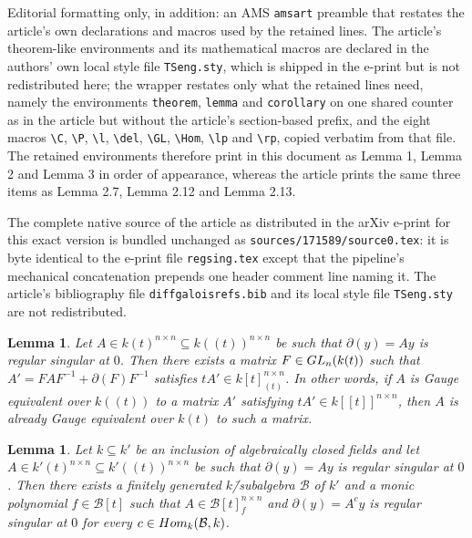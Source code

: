 \documentclass[10pt,a4paper]{amsart}
\newtheorem{lemma}[theorem]{Lemma}
\def\l{\mathcal}
\def\del{\partial}
\def\GL{\textup{GL}}
\def\Hom{\textup{Hom}}
\begin{document}
Editorial formatting only, in addition: an AMS \texttt{amsart} preamble that restates the article's own declarations and macros used by the retained lines. The article's theorem-like environments and its mathematical macros are declared in the authors' own local style file \texttt{TSeng.sty}, which is shipped in the e-print but is not redistributed here; the wrapper restates only what the retained lines need, namely the environments \texttt{theorem}, \texttt{lemma} and \texttt{corollary} on one shared counter as in the article but without the article's section-based prefix, and the eight macros \texttt{\textbackslash C}, \texttt{\textbackslash P}, \texttt{\textbackslash l}, \texttt{\textbackslash del}, \texttt{\textbackslash GL}, \texttt{\textbackslash Hom}, \texttt{\textbackslash lp} and \texttt{\textbackslash rp}, copied verbatim from that file. The retained environments therefore print in this document as Lemma 1, Lemma 2 and Lemma 3 in order of appearance, whereas the article prints the same three items as Lemma 2.7, Lemma 2.12 and Lemma 2.13.

The complete native source of the article as distributed in the arXiv e-print for this exact version is bundled unchanged as \texttt{sources/171589/source0.tex}: it is byte identical to the e-print file \texttt{regsing.tex} except that the pipeline's mechanical concatenation prepends one header comment line naming it. The article's bibliography file \texttt{diffgaloisrefs.bib} and its local style file \texttt{TSeng.sty} are not redistributed.
\begin{lemma}\label{lem:basis}
	Let $A \in k(t)^{n\times n}\subseteq k((t))^{n\times n}$ be such that $\del(y)=Ay$ is regular singular at $0$. Then there
	exists a matrix $F\in \GL_n(k(t))$ such that $A'=FAF^{-1}+\del(F)F^{-1}$ satisfies $tA'\in k[t]_{(t)}^{n\times n}$. In other words, if $A$ is Gauge equivalent over $k((t))$ to a matrix $A'$ satisfying $tA'\in  k[[t]]^{n\times n}$, then $A$ is already Gauge equivalent over $k(t)$ to such a matrix.
\end{lemma}

\begin{lemma}\label{lem: specialize regsing at 0}
	Let $k\subseteq k'$ be an inclusion of algebraically closed fields and let $A \in k'(t)^{n \times n}\subseteq k'((t))^{n\times n}$ be such that $\del(y)=Ay$ is regular singular at $0$. Then there exists a finitely generated $k$\=/subalgebra $\l B$ of $k'$ and a monic polynomial $f \in \l B[t]$ such that $A \in \l B[t]_f^{n \times n}$ and $\del(y)=A^c y$ is regular singular at $0$ for every $c \in \Hom_k(\l B, k)$.	
\end{lemma}
\end{document}
